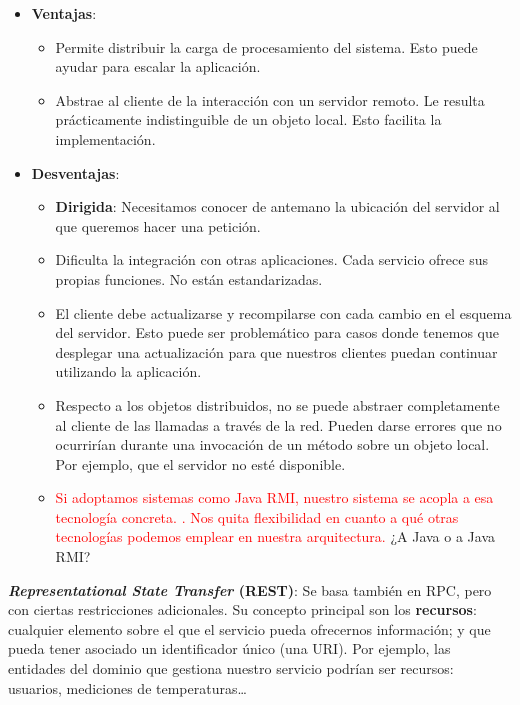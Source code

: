 \begin{itemize}
  \item \textbf{Ventajas}:
  \begin{itemize}
    \item Permite distribuir la carga de procesamiento del sistema. Esto puede ayudar para escalar la aplicación.

    \item Abstrae al cliente de la interacción con un servidor remoto. Le resulta prácticamente indistinguible de un objeto local. Esto facilita la implementación.

  \end{itemize}

  \item \textbf{Desventajas}:
  \begin{itemize}
    \item \textbf{Dirigida}: Necesitamos conocer de antemano la ubicación del servidor al que queremos hacer una petición.

    \item Dificulta la integración con otras aplicaciones. Cada servicio ofrece sus propias funciones. No están estandarizadas.

    \item El cliente debe actualizarse y recompilarse con cada cambio en el esquema del servidor. Esto puede ser problemático para casos donde tenemos que desplegar una actualización para que nuestros clientes puedan continuar utilizando la aplicación.

    \item Respecto a los objetos distribuidos, no se puede abstraer completamente al cliente de las llamadas a través de la red. Pueden darse errores que no ocurrirían durante una invocación de un método sobre un objeto local. Por ejemplo, que el servidor no esté disponible. \cite{jausovecFallaciesDistributedSystems2020}

    \item \textcolor{red}{Si adoptamos sistemas como Java RMI, nuestro sistema se acopla a esa tecnología concreta. \cite{newmanBuildingMicroservicesDesigning2021}. Nos quita flexibilidad en cuanto a qué otras tecnologías podemos emplear en nuestra arquitectura.} ¿A Java o a Java RMI?
  \end{itemize}
\end{itemize}

\textbf{\emph{Representational State Transfer} (REST)}: Se basa también en RPC, pero con ciertas restricciones adicionales. \cite{taylorSoftwareArchitectureFoundations2009} Su concepto principal son los \textbf{recursos}: cualquier elemento sobre el que el servicio pueda ofrecernos información; y que pueda tener asociado un identificador único (una URI). \cite{richardsonRESTfulWebServices2007} Por ejemplo, las entidades del dominio que gestiona nuestro servicio podrían ser recursos: usuarios, mediciones de temperaturas\dots

